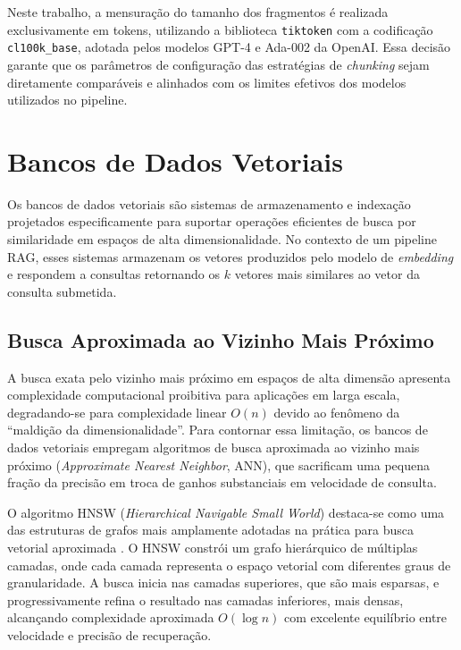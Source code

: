 \documentclass[
	12pt,				%
	openright,			%
	oneside,			%
	a4paper,			%
	tccpreliminar,		%
	]{ABNT-DC-UEL}
\begin{document}
Neste trabalho, a mensuração do tamanho dos fragmentos é realizada exclusivamente em tokens, utilizando a biblioteca \texttt{tiktoken} com a codificação \texttt{cl100k\_base}, adotada pelos modelos GPT-4 e Ada-002 da OpenAI. Essa decisão garante que os parâmetros de configuração das estratégias de \textit{chunking} sejam diretamente comparáveis e alinhados com os limites efetivos dos modelos utilizados no pipeline.


\section{Bancos de Dados Vetoriais}
\label{sec:vectordb}

Os bancos de dados vetoriais são sistemas de armazenamento e indexação projetados especificamente para suportar operações eficientes de busca por similaridade em espaços de alta dimensionalidade. No contexto de um pipeline RAG, esses sistemas armazenam os vetores produzidos pelo modelo de \textit{embedding} e respondem a consultas retornando os $k$ vetores mais similares ao vetor da consulta submetida.

\subsection{Busca Aproximada ao Vizinho Mais Próximo}

A busca exata pelo vizinho mais próximo em espaços de alta dimensão apresenta complexidade computacional proibitiva para aplicações em larga escala, degradando-se para complexidade linear $O(n)$ devido ao fenômeno da ``maldição da dimensionalidade''. Para contornar essa limitação, os bancos de dados vetoriais empregam algoritmos de busca aproximada ao vizinho mais próximo (\textit{Approximate Nearest Neighbor}, ANN), que sacrificam uma pequena fração da precisão em troca de ganhos substanciais em velocidade de consulta.

O algoritmo HNSW (\textit{Hierarchical Navigable Small World}) destaca-se como uma das estruturas de grafos mais amplamente adotadas na prática para busca vetorial aproximada \cite{malkov2018hnsw}. O HNSW constrói um grafo hierárquico de múltiplas camadas, onde cada camada representa o espaço vetorial com diferentes graus de granularidade. A busca inicia nas camadas superiores, que são mais esparsas, e progressivamente refina o resultado nas camadas inferiores, mais densas, alcançando complexidade aproximada $O(\log n)$ com excelente equilíbrio entre velocidade e precisão de recuperação.
\end{document}
